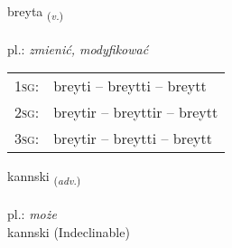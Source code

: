 \documentclass[frontgrid, backgrid]{flacards}\usepackage[]{graphicx}\usepackage[]{xcolor}
\begin{document}
\renewcommand{\blhead}{\vskip5pt {\small\bfseries\footnotesize Sagnorð | Verb }}
\renewcommand{\bcfoot}{\vskip5pt \hspace{2pt}{\small\bfseries\footnotesize 1K}}


{breyta \small{\textsubscript{(\textit{v.})}} \\[1ex] %
\textphonetic{[preiːta]} \\
pl.: \emph{zmienić, modyfikować} \\  [2ex]
\renewcommand*{\arraystretch}{0.8}
\begin{tabular}{p{1cm}l}
\textsc{1sg}: & breyti -- breytti -- breytt \\ 
\textsc{2sg}: & breytir -- breyttir -- breytt \\ 
\textsc{3sg}: & breytir -- breytti -- breytt \\ 
\end{tabular}
}


\renewcommand{\flhead}{\vskip5pt \fboxsep=0pt {\small\bfseries\footnotesize Atviksorð | Adverb}}
\renewcommand{\fcfoot}{\vskip5pt \fboxsep=0pt \hspace{2pt}{\small\bfseries\footnotesize 1K}}

\renewcommand{\blhead}{\vskip5pt {\small\bfseries\footnotesize Atviksorð | Adverb }}
\renewcommand{\bcfoot}{\vskip5pt \hspace{2pt}{\small\bfseries\footnotesize 1K}}


{kannski \small{\textsubscript{(\textit{adv.})}} \\[1ex]
\textphonetic{[kʰanscɪ]} \\
pl.: \emph{może} \\  [2ex]
kannski (Indeclinable)}

\renewcommand{\flhead}{\vskip5pt \fboxsep=0pt {\small\bfseries\footnotesize Nafnorð | Noun}}
\renewcommand{\fcfoot}{\vskip5pt \fboxsep=0pt \hspace{2pt}{\small\bfseries\footnotesize 1K}}

\renewcommand{\blhead}{\vskip5pt {\small\bfseries\footnotesize Nafnorð | Noun }}
\renewcommand{\bcfoot}{\vskip5pt \hspace{2pt}{\small\bfseries\footnotesize 1K}}
\end{document}
